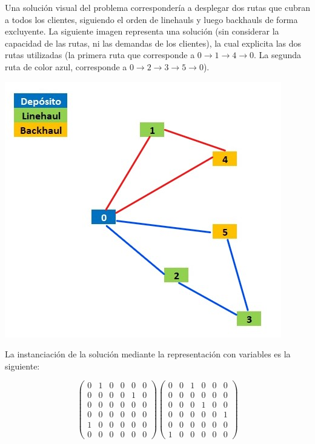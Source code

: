 \documentclass[letter, 10pt]{article}
\begin{document}
Una solución visual del problema correspondería a desplegar dos rutas que cubran a todos los clientes, siguiendo el orden de linehauls y luego backhauls de forma excluyente. La siguiente imagen representa una solución (sin considerar la capacidad de las rutas, ni las demandas de los clientes), la cual explicita las dos rutas utilizadas (la primera ruta que corresponde a $ 0 \rightarrow 1 \rightarrow 4 \rightarrow 0 $. La segunda ruta de color azul, corresponde a $0 \rightarrow 2 \rightarrow 3 \rightarrow 5 \rightarrow 0$).

\begin{center}
\includegraphics[scale=0.5]{Instancia final.jpg}
\end{center}

La instanciación de la solución mediante la representación con variables es la siguiente:

\[ 
\left(
\begin{matrix}
0 & 1 & 0 & 0 & 0 & 0\\
0 & 0 & 0 & 0 & 1 & 0\\
0 & 0 & 0 & 0 & 0 & 0\\
0 & 0 & 0 & 0 & 0 & 0\\
1 & 0 & 0 & 0 & 0 & 0\\
0 & 0 & 0 & 0 & 0 & 0
\end{matrix}
\right)
%
\left(
\begin{matrix}
0 & 0 & 1 & 0 & 0 & 0\\
0 & 0 & 0 & 0 & 0 & 0\\
0 & 0 & 0 & 1 & 0 & 0\\
0 & 0 & 0 & 0 & 0 & 1\\
0 & 0 & 0 & 0 & 0 & 0\\
1 & 0 & 0 & 0 & 0 & 0
\end{matrix}
\right)
\]
\end{document}
